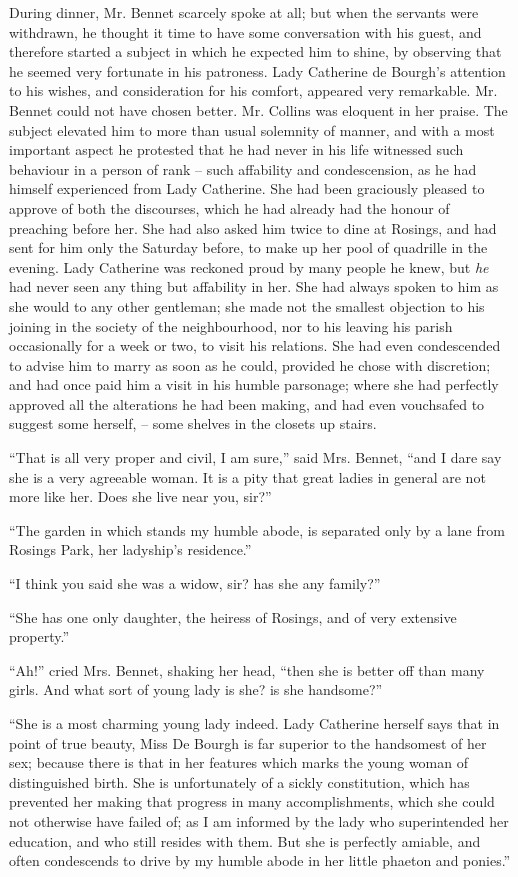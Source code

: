 During dinner, Mr. Bennet scarcely spoke at all; but
when the servants were withdrawn, he thought it time
to have some conversation with his guest, and therefore
started a subject in which he expected him to shine, by
observing that he seemed very fortunate in his patroness.
Lady Catherine de Bourgh’s attention to his wishes, and
consideration for his comfort, appeared very remarkable.
Mr. Bennet could not have chosen better. Mr. Collins
was eloquent in her praise. The subject elevated him to
more than usual solemnity of manner, and with a most
important aspect he protested that he had never in his
life witnessed such behaviour in a person of rank -- such
affability and condescension, as he had himself experienced
from Lady Catherine. She had been graciously pleased
to approve of both the discourses, which he had already
had the honour of preaching before her. She had also
asked him twice to dine at Rosings, and had sent for him
only the Saturday before, to make up her pool of quadrille
in the evening. Lady Catherine was reckoned proud by
many people he knew, but \textit{he} had never seen any thing
but affability in her. She had always spoken to him as
she would to any other gentleman; she made not the
smallest objection to his joining in the society of the
neighbourhood, nor to his leaving his parish occasionally
for a week or two, to visit his relations. She had even
condescended to advise him to marry as soon as he could,
provided he chose with discretion; and had once paid
him a visit in his humble parsonage; where she had
perfectly approved all the alterations he had been making,
and had even vouchsafed to suggest some herself, -- some
shelves in the closets up stairs.

“That is all very proper and civil, I am sure,” said
Mrs. Bennet, “and I dare say she is a very agreeable
woman. It is a pity that great ladies in general are not
more like her. Does she live near you, sir?”

“The garden in which stands my humble abode, is
separated only by a lane from Rosings Park, her ladyship’s
residence.”

“I think you said she was a widow, sir? has she any
family?”

“She has one only daughter, the heiress of Rosings,
and of very extensive property.”

“Ah!” cried Mrs. Bennet, shaking her head, “then
she is better off than many girls. And what sort of young
lady is she? is she handsome?”

“She is a most charming young lady indeed. Lady
Catherine herself says that in point of true beauty, Miss
De Bourgh is far superior to the handsomest of her sex;
because there is that in her features which marks the
young woman of distinguished birth. She is unfortunately
of a sickly constitution, which has prevented her
making that progress in many accomplishments, which
she could not otherwise have failed of; as I am informed
by the lady who superintended her education, and who
still resides with them. But she is perfectly amiable,
and often condescends to drive by my humble abode in
her little phaeton and ponies.”

